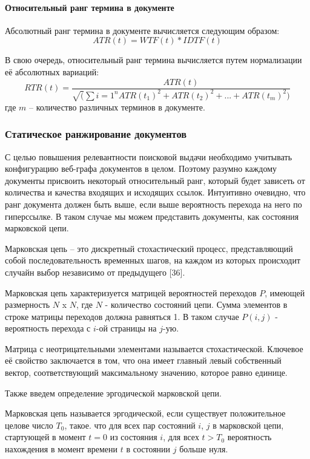 \paragraph{Относительный ранг термина в документе}

Абсолютный ранг термина в документе вычисляется следующим образом:
\begin{equation}
ATR(t) = WTF(t) * IDTF(t)
\end{equation}

В свою очередь, относительный ранг термина вычисляется путем нормализации её абсолютных вариаций:
\begin{equation}
RTR(t) = \frac{ATR(t)}{\sqrt(\sum{i = 1}^{n}ATR(t_1)^2 + ATR(t_2)^2 + ... + ATR(t_m)^2)}
\end{equation} где $m$ -- количество различных терминов в документе.

\subsubsection{Статическое ранжирование документов}

С целью повышения релевантности поисковой выдачи необходимо учитывать конфигурацию веб-графа документов в целом. Поэтому разумно каждому документы присвоить некоторый относительный ранг, который будет зависеть от количества и качества входящих и исходящих ссылок. Интуитивно очевидно, что ранг документа должен быть выше, если выше вероятность перехода на него по гиперссылке. В таком случае мы можем представить документы, как состояния марковской цепи. 

Марковская цепь -- это дискретный стохастический процесс, представляющий собой последовательность временных шагов, на каждом из которых происходит случайн выбор независимо от предыдущего [36].

Марковская цепь характеризуется матрицей вероятностей переходов $P$, имеющей размерность $N$ x $N$, где $N$ - количество состояний цепи. Сумма элементов в строке матрицы переходов должна равняться 1. В таком случае $P(i, j)$ - вероятность перехода с $i$-ой страницы на $j$-ую.

Матрица с неотрицательными элементами называется стохастической. Ключевое её свойство заключается в том, что она имеет главный левый собственный вектор, соответствующий максимальному значению, которое равно единице.

Также введем определение эргодической марковской цепи.

Марковская цепь называется эргодической, если существует положительное целове число $T_0$, такое. что для всех пар состояний $i$, $j$ в марковской цепи, стартующей в момент $t = 0$ из состояния $i$, для всех $t > T_0$ вероятность нахождения в момент времени $t$ в состоянии $j$ больше нуля.


